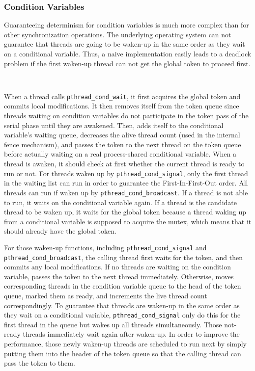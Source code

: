 \subsubsection{Condition Variables}
\label{sec:condwait}

Guaranteeing determinism for condition variables is much more complex than for other synchronization operations. The underlying operating system can not guarantee that threads are going to be waken-up in the same order as they wait on a conditional variable. Thus, a naive implementation easily leads to a deadlock problem if the first waken-up thread can not get the global token to proceed first.

\\\TTTTTTTTONGPING

When a thread calls \texttt{pthread\_cond\_wait}, it first acquires the global token and commits local modifications. It then removes itself from the token queue since threads waiting on condition variables do not participate in the token pass of the serial phase until they are awakened. Then, \dthreads{} adds itself to the conditional variable's waiting queue, decreases the alive thread count (used in the internal fence mechanism), and passes the token to the next thread on the token queue before actually waiting on a real process-shared conditional variable. When a thread is awaken, it should check at first whether the current thread is ready to run or not. For threads waken up by \texttt{pthread\_cond\_signal}, only the first thread in the waiting list can run in order to guarantee the First-In-First-Out order. All threads can run if waken up by \texttt{pthread\_cond\_broadcast}. If a thread is not able to run, it waits on the conditional variable again. If a thread is the candidate thread to be waken up, it waits for the global token because a thread waking up from a conditional variable is supposed to acquire the mutex, which means that it should already have the global token. 

For those waken-up functions, including \texttt{pthread\_cond\_signal} and \texttt{pthread\_cond\_broadcast}, the calling thread first waits for the token, and then commits any local modifications. If no threads are waiting on the condition variable, \dthreads{} passes the token to the next thread immediately. Otherwise, \dthreads{} moves corresponding threads in the condition variable queue to the head of the token queue, marked them as ready, and increments the live thread count correspondingly. To guarantee that threads are waken-up in the same order as they wait on a conditional variable, \texttt{pthread\_cond\_signal} only do this for the first thread in the queue but \dthreads{} wakes up all threads simultaneously. Those not-ready threads immediately wait again after waken-up. In order to improve the performance, those newly waken-up threads are scheduled to run next by simply putting them into the header of the token queue so that the calling thread can pass the token to them. 


